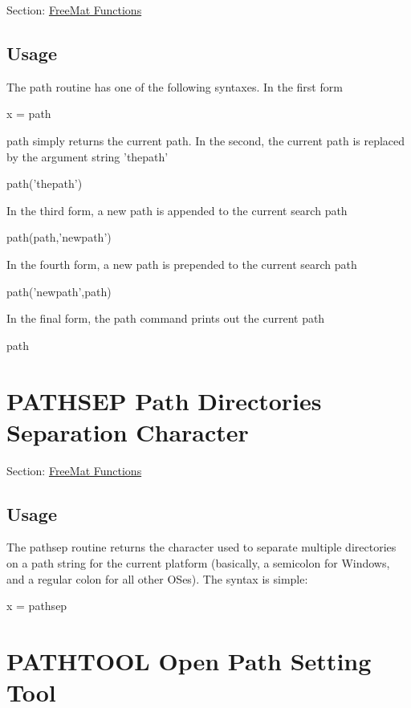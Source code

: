 Section\-: \hyperlink{sec_freemat}{Free\-Mat Functions} \hypertarget{vtkwidgets_vtkxyplotwidget_Usage}{}\subsection{Usage}\label{vtkwidgets_vtkxyplotwidget_Usage}
The {\ttfamily path} routine has one of the following syntaxes. In the first form \begin{DoxyVerb}  x = path
\end{DoxyVerb}
 {\ttfamily path} simply returns the current path. In the second, the current path is replaced by the argument string {\ttfamily 'thepath'} \begin{DoxyVerb}  path('thepath')
\end{DoxyVerb}
 In the third form, a new path is appended to the current search path \begin{DoxyVerb}  path(path,'newpath')
\end{DoxyVerb}
 In the fourth form, a new path is prepended to the current search path \begin{DoxyVerb}  path('newpath',path)
\end{DoxyVerb}
 In the final form, the path command prints out the current path \begin{DoxyVerb}  path
\end{DoxyVerb}
 \hypertarget{freemat_pathsep}{}\section{P\-A\-T\-H\-S\-E\-P Path Directories Separation Character}\label{freemat_pathsep}
Section\-: \hyperlink{sec_freemat}{Free\-Mat Functions} \hypertarget{vtkwidgets_vtkxyplotwidget_Usage}{}\subsection{Usage}\label{vtkwidgets_vtkxyplotwidget_Usage}
The {\ttfamily pathsep} routine returns the character used to separate multiple directories on a path string for the current platform (basically, a semicolon for Windows, and a regular colon for all other O\-Ses). The syntax is simple\-: \begin{DoxyVerb}  x = pathsep
\end{DoxyVerb}
 \hypertarget{freemat_pathtool}{}\section{P\-A\-T\-H\-T\-O\-O\-L Open Path Setting Tool}\label{freemat_pathtool}
